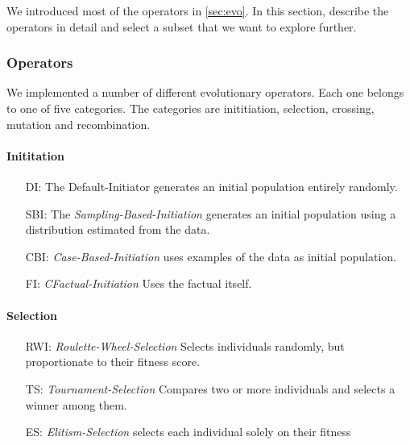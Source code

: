 \documentclass[./../../paper.tex]{subfiles}
\begin{document}



We introduced most of the operators in \autoref{sec:evo}. In this section, describe the operators in detail and select a subset that we want to explore further. 

\subsubsection{Operators}
We implemented a number of different evolutionary operators. Each one belongs to one of five categories. The categories are inititiation, selection, crossing, mutation and recombination.  

\paragraph{Inititation}
\begin{enumerate}
    \item[DI:] The Default-Initiator generates an initial population entirely randomly. 
    \item[SBI:] The \emph{Sampling-Based-Initiation} generates an initial population using a distribution estimated from the data. 
    \item[CBI:] \emph{Case-Based-Initiation} uses examples of the data as initial population. 
    \item[FI:] \emph{CFactual-Initiation} Uses the factual itself. 
\end{enumerate}

\paragraph{Selection}
\begin{enumerate}
    \item[RWI:] \emph{Roulette-Wheel-Selection} Selects individuals randomly, but proportionate to their fitness score. 
    \item[TS:] \emph{Tournament-Selection} Compares two or more individuals and selects a winner among them. 
    \item[ES:] \emph{Elitism-Selection} selects each individual solely on their fitness 
\end{enumerate}
\end{document}

